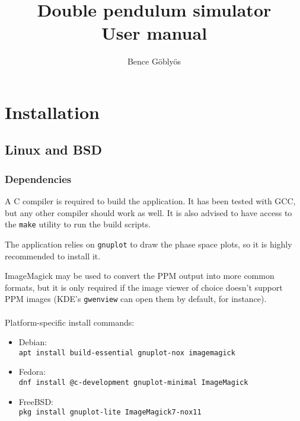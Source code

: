 \documentclass[a4paper,12pt]{article}
\title{Double pendulum simulator\\User manual}
\author{Bence Göblyös}
\begin{document}
\maketitle
\newpage
{}

\section{Installation}

\subsection{Linux and BSD}

\subsubsection{Dependencies}
A C compiler is required to build the application.
It has been tested with GCC, but any other compiler should work as well.
It is also advised to have access to the \texttt{make} utility to run the build scripts.

The application relies on \texttt{gnuplot} to draw the phase space plots,
so it is highly recommended to install it.

ImageMagick may be used to convert the PPM output into more common formats,
but it is only required if the image viewer of choice doesn't support PPM images
(KDE's \texttt{gwenview} can open them by default, for instance).\\\\
Platform-specific install commands:
\begin{itemize}
 \item Debian:\\ \texttt{apt install build-essential gnuplot-nox imagemagick}
 \item Fedora:\\ \texttt{dnf install @c-development gnuplot-minimal ImageMagick}
 \item FreeBSD:\\ \texttt{pkg install gnuplot-lite ImageMagick7-nox11}
\end{itemize}
\end{document}
